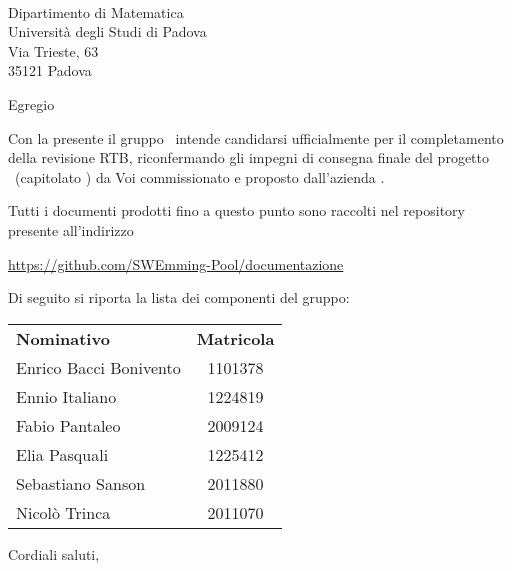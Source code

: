 \documentclass[12pt, boldsubject, italicsignature, noindent]{letteracdp}
\date{}
\begin{document}
\begin{letter}{
        \Vardanega \\
        Dipartimento di Matematica \\
        Università degli Studi di Padova \\
        Via Trieste, 63 \\ 35121 Padova
    }

    \opening{Egregio \vardanega}

    Con la presente il gruppo \groupName\ intende candidarsi ufficialmente per il completamento della revisione RTB, riconfermando gli impegni di consegna finale del progetto \capName\ (capitolato \capCode) da Voi commissionato e proposto dall'azienda \capProposer.

    Tutti i documenti prodotti fino a questo punto sono raccolti nel repository presente all'indirizzo
    \begin{center}
        \url{https://github.com/SWEmming-Pool/documentazione}
        \hfill{}
    \end{center}

    Di seguito si riporta la lista dei componenti del gruppo:

    \begin{center}
        \begin{tabular}{l|c}
            \textbf{Nominativo}    & \textbf{Matricola} \\
            Enrico Bacci Bonivento & 1101378            \\
            Ennio Italiano         & 1224819            \\
            Fabio Pantaleo         & 2009124            \\
            Elia Pasquali          & 1225412            \\
            Sebastiano Sanson      & 2011880            \\
            Nicolò Trinca          & 2011070
        \end{tabular}
    \end{center}

    \closing{Cordiali saluti,}

\end{letter}
\end{document}
